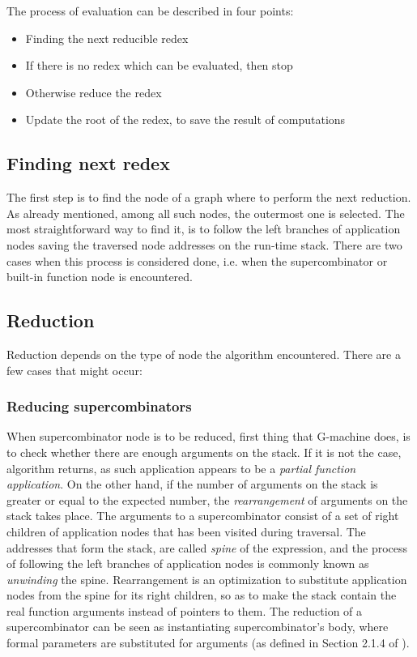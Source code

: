 \documentclass[12pt,a4paper]{report}
\begin{document}
The process of evaluation can be described in four points:

\begin{itemize}
  \item Finding the next reducible redex
  \item If there is no redex which can be evaluated, then stop
  \item Otherwise reduce the redex
  \item Update the root of the redex, to save the result of computations
\end{itemize}

\subsection{Finding next redex}
The first step is to find the node of a graph where to perform the next
reduction. As already mentioned, among all such nodes, the outermost one is
selected. The most straightforward way to find it, is to follow the left
branches of application nodes saving the traversed node addresses on the
run-time stack. There are two cases when this process is considered done, i.e.
when the supercombinator or built-in function node is encountered.

\subsection{Reduction}
Reduction depends on the type of node the algorithm encountered. There are a
few cases that might occur:

\subsubsection{Reducing supercombinators}
When supercombinator node is to be reduced, first thing that G-machine does, is
to check whether there are enough arguments on the stack. If it is not the
case, algorithm returns, as such application appears to be a \textit{partial
function application}. On the other hand, if the number of arguments on the
stack is greater or equal to the expected number, the \textit{rearrangement} of
arguments on the stack takes place. The arguments to a supercombinator consist
of a set of right children of application nodes that has been visited during
traversal. The addresses that form the stack, are called \textit{spine} of the
expression, and the process of following the left branches of application nodes
is commonly known as \textit{unwinding} the spine. Rearrangement is an
optimization to substitute application nodes from the spine for its right
children, so as to make the stack contain the real function arguments instead
of pointers to them. The reduction of a supercombinator can be seen as
instantiating supercombinator's body, where formal parameters are substituted
for arguments (as defined in Section 2.1.4 of \cite{JonLes00}).
\end{document}
